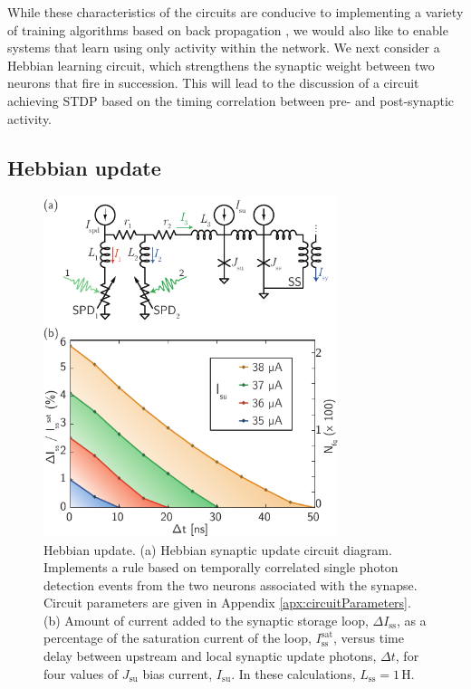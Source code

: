 \documentclass[twocolumn]{article}
\begin{document}
While these characteristics of the circuits are conducive to implementing a variety of training algorithms based on back propagation \cite{ni2015}, we would also like to enable systems that learn using only activity within the network. We next consider a Hebbian learning circuit, which strengthens the synaptic weight between two neurons that fire in succession. This will lead to the discussion of a circuit achieving STDP based on the timing correlation between pre- and post-synaptic activity.
	
\subsection{\label{sec:Hebbian}Hebbian update}
\begin{figure}[t!]
	\centerline{\includegraphics[width=8.6cm]{_synapticPlasticity_Hebbian_1_small.pdf}}
	\caption{\label{fig:synapticPlasticity_Hebbian_1}Hebbian update. (a) Hebbian synaptic update circuit diagram. Implements a rule based on temporally correlated single photon detection events from the two neurons associated with the synapse. Circuit parameters are given in Appendix \ref{apx:circuitParameters}. (b) Amount of current added to the synaptic storage loop, $\Delta I_{\mathrm{ss}}$, as a percentage of the saturation current of the loop, $I_{\mathrm{ss}}^{\mathrm{sat}}$, versus time delay between upstream and local synaptic update photons, $\Delta t$, for four values of $J_{\mathrm{su}}$ bias current, $I_{\mathrm{su}}$. In these calculations, $L_{\mathrm{ss}} = 1$\,\textmu H.}
\end{figure}
\end{document}
